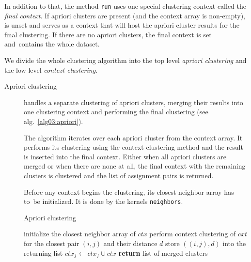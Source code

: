 In addition to that, the method \texttt{run} uses one special clustering context called the \emph{final context}. If apriori clusters are present (and the context array is non-empty),  is unset and serves as a context that will host the apriori cluster results for the final clustering. If there are no apriori clusters, the final context is set and~contains the whole dataset.

We divide the whole clustering algorithm into the top level \emph{apriori clustering} and the low level \emph{context clustering}.

\begin{description}
	\item[Apriori clustering] handles a separate clustering of apriori clusters, merging their results into one clustering context and performing the final clustering (see alg.~\ref{alg03:apriori}).
	
	The algorithm iterates over each apriori cluster from the context array. It performs its clustering using the context clustering method and the result is inserted into the final context. Either when all apriori clusters are merged or when there are none at all, the final context with the remaining clusters is clustered and the list of assignment pairs is returned.
	
	Before any context begins the clustering, its closest neighbor array has to~be initialized. It is done by the kernels \texttt{neighbors}.
	
	
	\begin{algorithm}
		\caption{Apriori clustering}
		\label{alg03:apriori}
		\begin{algorithmic}[1]
			 
			\State initialize the closest neighbor array of $ctx$ 
			\State perform context clustering of $cxt$ for the closest pair $(i,j)$ and their distance $d$
			\State store $((i,j),d)$ into the returning list
			\EndWhile
			\State $ctx_f \gets ctx_f \cup ctx$ 
			\EndFor
			\State \textbf{return} list of merged clusters
			\EndProcedure
		\end{algorithmic}
	\end{algorithm}


\end{description}
